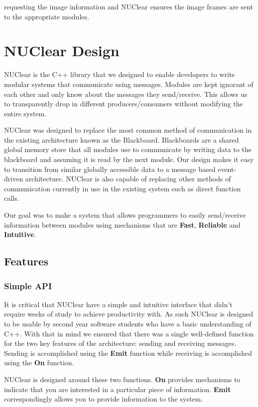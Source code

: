 \documentclass[english,12pt]{scrartcl}
\begin{document}
			requesting the image information and NUClear ensures the image frames are sent to the appropriate modules.
		
	\section{NUClear Design}
		NUClear is the C++ library that we designed to enable developers to write modular systems that communicate using messages. 
		Modules are kept ignorant of each other and only know about the messages they send/receive. 
		This allows us to transparently drop in different producers/consumers without modifying the entire system.
		
		NUClear was designed to replace the most common method of communication in the existing architecture known as the Blackboard.
		Blackboards are a shared global memory store that all modules use to communicate by writing data to the blackboard and assuming it is read by the next module.
		Our design makes it easy to transition from similar globally accessible data to a message based event-driven architecture.
		NUClear is also capable of replacing other methods of communication currently in use in the existing system such as direct function calls.
		
		Our goal was to make a system that allows programmers to easily send/receive information between modules using mechanisms that are \textbf{Fast}, \textbf{Reliable} and \textbf{Intuitive}.

		\subsection{Features}
			\subsubsection{Simple API}
				It is critical that NUClear have a simple and intuitive interface that didn't require weeks of study to achieve productivity with.
				As such NUClear is designed to be usable by second year software students who have a basic understanding of C++. 
				With that in mind we ensured that there was a single well-defined function for the two key features of the architecture: sending and receiving messages. Sending is accomplished using the \textbf{Emit} function while receiving is accomplished using the \textbf{On} function.
				
				NUClear is designed around these two functions. \textbf{On} provides mechanisms to indicate that you are interested in a particular piece of information.
				\textbf{Emit} correspondingly allows you to provide information to the system.
				
\end{document}
